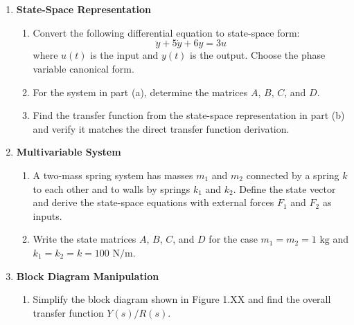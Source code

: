 \begin{enumerate}
\begin{enumerate}
\item If the motor has armature resistance $R_a = 2\text{ \Omega}$, inductance $L_a = 0.01\text{ H}$, and torque constant $K_t = 0.1\text{ N·m/A}$, derive the transfer function relating angular velocity $\omega_m(s)$ to applied voltage $V_a(s)$.

\item Repeat part (b) for the case where back EMF constant $K_e = 0.1\text{ V·s/rad}$ is different from $K_t$. Discuss the implications.

\end{enumerate}

\item \textbf{State-Space Representation}
\begin{enumerate}
\item Convert the following differential equation to state-space form:
\[
\ddot{y} + 5\dot{y} + 6y = 3u
\]
where $u(t)$ is the input and $y(t)$ is the output. Choose the phase variable canonical form.

\item For the system in part (a), determine the matrices $A$, $B$, $C$, and $D$.

\item Find the transfer function from the state-space representation in part (b) and verify it matches the direct transfer function derivation.

\end{enumerate}

\item \textbf{Multivariable System}
\begin{enumerate}
\item A two-mass spring system has masses $m_1$ and $m_2$ connected by a spring $k$ to each other and to walls by springs $k_1$ and $k_2$. Define the state vector and derive the state-space equations with external forces $F_1$ and $F_2$ as inputs.

\item Write the state matrices $A$, $B$, $C$, and $D$ for the case $m_1 = m_2 = 1\text{ kg}$ and $k_1 = k_2 = k = 100\text{ N/m}$.

\end{enumerate}

\item \textbf{Block Diagram Manipulation}
\begin{enumerate}
\item Simplify the block diagram shown in Figure 1.XX and find the overall transfer function $Y(s)/R(s)$.


\end{enumerate}
\end{enumerate}
